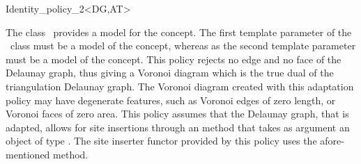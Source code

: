 

\begin{ccRefClass}{Identity_policy_2<DG,AT>}


\ccDefinition

The class \ccRefName\ provides a model for the 
concept. The first template parameter of the \ccRefName\ class must be a
model of the  concept, whereas as the second
template parameter must be a model of the  concept.
This policy rejects no edge and no face of the Delaunay graph, thus
giving a Voronoi diagram which is the true dual of the triangulation
Delaunay graph. The Voronoi diagram created with this adaptation
policy may have degenerate features, such as Voronoi edges of zero
length, or Voronoi faces of zero area. This policy assumes that the
Delaunay graph, that is adapted, allows for site insertions through an
 method that takes as argument an object of type
. The site inserter functor provided by this policy
uses the afore-mentioned  method.



\ccIsModel
{}

\ccTypes
{}

\ccSeeAlso
{}\\
\\
\end{ccRefClass}


